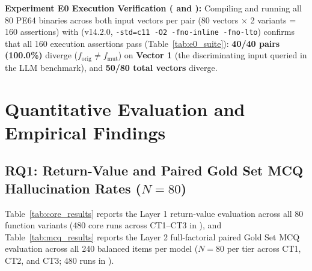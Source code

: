 \documentclass[conference]{IEEEtran}
\begin{document}
\textbf{Experiment E0 Execution Verification ( and ):} Compiling and running all 80 PE64 binaries across both input vectors per pair (80 vectors $\times$ 2 variants = 160 assertions) with  (v14.2.0, \texttt{-std=c11 -O2 -fno-inline -fno-lto}) confirms that all 160 execution assertions pass (Table~\ref{tab:e0_suite}): \textbf{40/40 pairs (100.0\%)} diverge ($f_{\text{orig}} \neq f_{\text{mut}}$) on \textbf{Vector 1} (the discriminating input queried in the LLM benchmark), and \textbf{50/80 total vectors} diverge.

\begin{table}[t]
\centering
\caption{Experiment E0 Dynamic Binary Execution Verification across all 40 pairs (80 compiled PE64 variants, 160 assertions).}
\label{tab:e0_suite}
\end{table}

\section{Quantitative Evaluation and Empirical Findings}

\subsection{RQ1: Return-Value and Paired Gold Set MCQ Hallucination Rates ($N=80$)}
Table~\ref{tab:core_results} reports the Layer 1 return-value evaluation across all 80 function variants (480 core runs across CT1--CT3 in ), and Table~\ref{tab:mcq_results} reports the Layer 2 full-factorial paired Gold Set MCQ evaluation across all 240 balanced items per model ($N=80$ per tier across CT1, CT2, and CT3; 480 runs in ).
\end{document}
